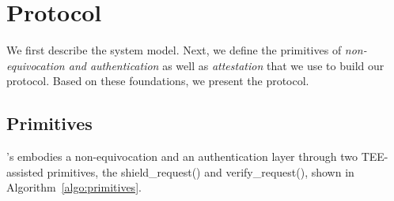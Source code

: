\section{\projecttitle{} Protocol}
\label{sec:recipe-protocol}

We first describe the system model. Next, we define the primitives of \emph{non-equivocation and authentication} as well as \emph{attestation} that we use to build our \projecttitle{} protocol. Based on these foundations, we present the \projecttitle{} protocol.






\subsection{\projecttitle{} Primitives}
 \projecttitle{}'s embodies a non-equivocation and an authentication layer through two TEE-assisted primitives, the shield\_request() and verify\_request(), shown in Algorithm~\ref{algo:primitives}.%


